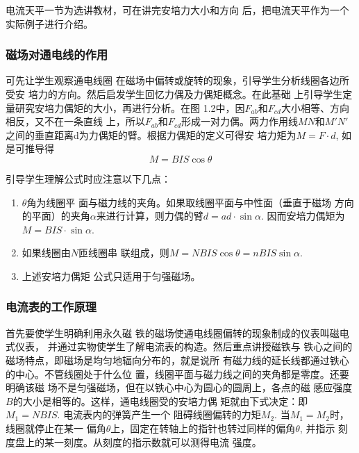 电流天平一节为选讲教材，可在讲完安培力大小和方向
后，把电流天平作为一个实际例子进行介绍。


\subsubsection{磁场对通电线的作用}

可先让学生观察通电线圈
在磁场中偏转或旋转的现象，引导学生分析线圈各边所受安
培力的方向。然后启发学生回忆力偶及力偶矩概念。在此基础
上引导学生定量研究安培力偶矩的大小，再进行分析。在图
1.2中，因$F_{ab}$和$F_{cd}$大小相等、方向相反，又不在一条直线
上，所以$F_{ab}$和$F_{cd}$形成一对力偶。两力作用线$MN$和$M'N'$
之间的垂直距离d为力偶矩的臂。根据力偶矩的定义可得安
培力矩为$M=F\cdot d$, 如是可推导得
\[M=BIS\cos\theta\]

引导学生理解公式时应注意以下几点：
\begin{enumerate}
\item $\theta$角为线圈平
面与磁力线的夹角。如果取线圈平面与中性面（垂直于磁场
方向的平面）的夹角$\alpha$来进行计算，则力偶的臂$d=ad\cdot \sin\alpha$.
因而安培力偶矩为$M=BIS\cdot \sin\alpha$.
\item 如果线圈由$N$匝线圈串
联组成，则$M=NBIS\cos\theta=nBIS\sin\alpha$.
\item 上述安培力偶矩
公式只适用于匀强磁场。
\end{enumerate}

\subsubsection{电流表的工作原理}

首先要使学生明确利用永久磁
铁的磁场使通电线圈偏转的现象制成的仪表叫磁电式仪表，
并通过实物使学生了解电流表的构造。然后重点讲授磁铁与
铁心之间的磁场特点，即磁场是均匀地辐向分布的，就是说所
有磁力线的延长线都通过铁心的中心。不管线圈处于什么位
置，线圈平面与磁力线之间的夹角都是零度。还要明确该磁
场不是匀强磁场，但在以铁心中心为圆心的圆周上，各点的磁
感应强度$B$的大小是相等的。这样，通电线圈受的安培力偶
矩就由下式决定：即$M_1=NBIS$. 电流表内的弹簧产生一个
阻碍线圈偏转的力矩$M_2$. 当$M_1=M_2$时，线圈就停止在某一
偏角$\theta$上，固定在转轴上的指针也转过同样的偏角$\theta$, 并指示
刻度盘上的某一刻度。从刻度的指示数就可以测得电流
强度。

